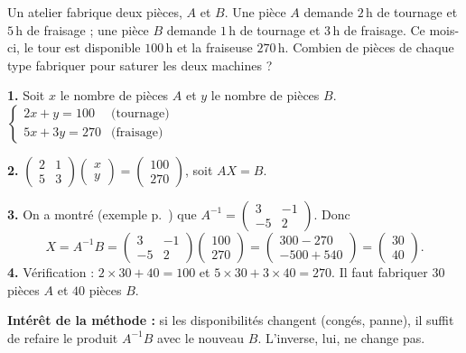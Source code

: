 \documentclass[a4paper,11pt]{article}
\newcommand{\M}[1]{\begin{pmatrix}#1\end{pmatrix}}
\begin{document}
\begin{appliindus}\label{ex:plancharge}
Un atelier fabrique deux pièces, $A$ et $B$. Une pièce $A$ demande $2$\,h de tournage et $5$\,h de fraisage ; une pièce $B$ demande $1$\,h de tournage et $3$\,h de fraisage. Ce mois-ci, le tour est disponible $100$\,h et la fraiseuse $270$\,h. Combien de pièces de chaque type fabriquer pour saturer les deux machines ?

\textbf{1.} Soit $x$ le nombre de pièces $A$ et $y$ le nombre de pièces $B$.
\qquad
$\left\{\begin{array}{ll} 2x + y = 100 & \text{(tournage)}\\ 5x + 3y = 270 & \text{(fraisage)}\end{array}\right.$

\textbf{2.} $\M{2 & 1\\ 5 & 3}\M{x\\y} = \M{100\\270}$, soit $AX = B$.

\textbf{3.} On a montré (exemple p.~\pageref{ex:verifinverse}) que $A^{-1}=\M{3 & -1\\ -5 & 2}$. Donc
\[
X = A^{-1}B = \M{3 & -1\\ -5 & 2}\M{100\\270} = \M{300 - 270\\ -500 + 540} = \M{30\\40}.
\]
\textbf{4.} Vérification : $2\times 30 + 40 = 100$ et $5\times 30 + 3\times 40 = 270$. Il faut fabriquer $30$ pièces $A$ et $40$ pièces $B$.

\textbf{Intérêt de la méthode :} si les disponibilités changent (congés, panne), il suffit de refaire le produit $A^{-1}B$ avec le nouveau $B$. L'inverse, lui, ne change pas.
\end{appliindus}
\end{document}
